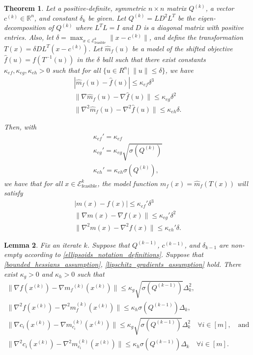 \documentclass{article}
\newtheorem{theorem}{Theorem}[section]
\newtheorem{lemma}[theorem]{Lemma}
\theoremstyle{case}
\numberwithin{theorem}{subsection}
\newcommand{\ck}{{c^{(k)}}}
\newcommand{\dk}{\Delta_k}
\newcommand{\gmcik}{{\nabla m_{c_i}^{(k)}\left(\xk\right)}}
\newcommand{\gradf}{\nabla f}
\newcommand{\hk}{{\nabla^2m_f^{(k)}\left(\xk\right)}}
\newcommand{\mfk}{{{m}_f}^{(k)}}
\newcommand{\qk}{{Q^{(k)}}}
\newcommand{\Rn}{\mathbb R^n}
\newcommand{\sdk}{{\delta_k}}
\newcommand{\unshiftedellipsoid}{{\mathcal E^k_{\textrm{feasible}}}}
\newcommand{\xk}{x^{(k)}}
\newcommand{\qkmo}{{Q^{(k-1)}}}
\newcommand{\ckmo}{{c^{(k-1)}}}
\newcommand{\sdkmo}{{\delta_{k-1}}}
\begin{document}
\begin{theorem}
\label{shifted_ellipsoid}
Let a positive-definite, symmetric $n\times n$ matrix $\qk$, a vector $\ck \in \Rn$, and constant $\sdk$ be given.
Let $\qk = L D^2 L^T$ be the eigen-decomposition of $\qk$ where $L^TL = I$ and $D$ is a diagonal matrix with positive entries.
Also, let $\delta = \max_{x\in \unshiftedellipsoid}\|x-\ck\|$, 
and define the transformation $T(x) = \delta DL^T(x - \ck)$.
Let $\hat m_f(u)$ be a model of the shifted objective $\hat f(u) = f(T^{-1}(u))$ in the $\delta$ ball such that
there exist constants $\kappa_{ef}, \kappa_{eg}, \kappa_{eh} > 0$ such that for all $\{u \in R^n | \;\|u\| \le \delta \}$, we have
\begin{align*}
|\hat m_f(u) - \hat f(u)| \le \kappa_{ef} \delta^3\\
\|\nabla \hat m_f(u) - \nabla \hat f(u)\| \le \kappa_{eg}\delta^2\\
\|\nabla^2 \hat m_f(u) - \nabla^2 \hat f(u)\| \le \kappa_{eh}\delta.
\end{align*}

Then, with
\begin{align*}
\kappa_{ef}' = \kappa_{ef} \\
\kappa_{eg}' = \kappa_{eg}\sqrt{\sigma(\qk)} \\
\kappa_{eh}' = \kappa_{eh}\sigma(\qk),
\end{align*}
we have that for all $x \in \unshiftedellipsoid$,
the model function $m_f(x) = \hat m_f(T(x))$ will satisfy
\begin{align*}
| m(x) - f(x)| \le \kappa_{ef}'\delta^3 \\
\|\nabla  m(x) - \nabla  f(x)\| \le \kappa_{eg}'\delta^2 \\
\|\nabla^2 m(x) - \nabla^2 f(x)\| \le \kappa_{eh}'\delta.
\end{align*}
\end{theorem}


\begin{lemma}
\label{accuracy_is_satisfied_lemma}
Fix an iterate $k$.
Suppose that $\qkmo$, $\ckmo$, and $\sdkmo$ are non-empty according to \cref{ellipsoids_notation_definitions}.
Suppose that \cref{bounded_hessians_assumption}, \cref{lipschitz_gradients_assumption} hold.
There exist $\kappa_g>0$ and $\kappa_h>0$ such that
\begin{align*}
\|\gradf(\xk) - \nabla \mfk(\xk) \| \le \kappa_g \sqrt{\sigma \left(\qkmo\right)} \dk^2, \\
\|\nabla^2 f(\xk) - \hk \| \le \kappa_h \sigma \left(\qkmo\right) \dk,  \\
\|\nabla c_i(\xk) - \gmcik \| \le \kappa_g \sqrt{\sigma \left(\qkmo\right)} \dk^2 \quad \forall i \in [m], \quad \textrm{and}\\
\|\nabla^2 c_i(\xk) - \nabla^2 m_{c_i}^{(k)}(\xk) \| \le \kappa_h \sigma \left(\qkmo\right) \dk \quad \forall i \in [m]. \\
\end{align*}
\end{lemma}
\end{document}
